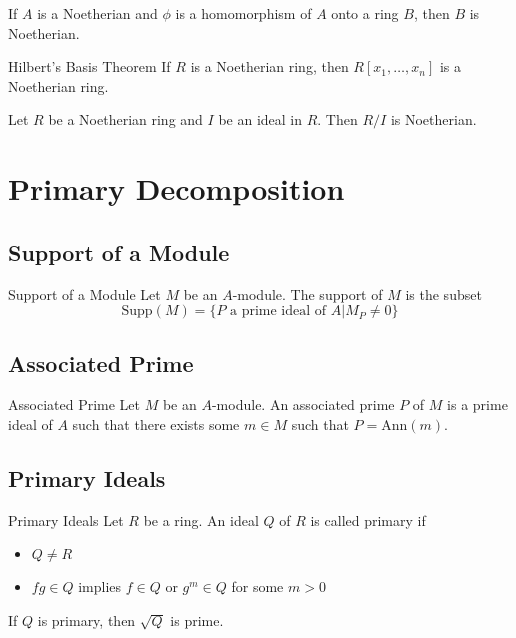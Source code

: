 \documentclass[a4paper]{article}
\begin{document}
\begin{prp}{}{} If $A$ is a Noetherian and $\phi$ is a homomorphism of $A$ onto a ring $B$, then $B$ is Noetherian. 
\end{prp}

\begin{thm}{Hilbert's Basis Theorem}{} If $R$ is a Noetherian ring, then $R[x_1,\dots,x_n]$ is a Noetherian ring. 
\end{thm}

\begin{prp}{}{} Let $R$ be a Noetherian ring and $I$ be an ideal in $R$. Then $R/I$ is Noetherian. 
\end{prp}

\pagebreak
\section{Primary Decomposition}
\subsection{Support of a Module}
\begin{defn}{Support of a Module}{} Let $M$ be an $A$-module. The support of $M$ is the subset $$\text{Supp}(M)=\{P\text{ a prime ideal of }A|M_P\neq 0\}$$
\end{defn}

\subsection{Associated Prime}
\begin{defn}{Associated Prime}{} Let $M$ be an $A$-module. An associated prime $P$ of $M$ is a prime ideal of $A$ such that there exists some $m\in M$ such that $P=\text{Ann}(m)$. 
\end{defn}

\subsection{Primary Ideals}
\begin{defn}{Primary Ideals}{} Let $R$ be a ring. An ideal $Q$ of $R$ is called primary if
\begin{itemize}
\item $Q\neq R$
\item $fg\in Q$ implies $f\in Q$ or $g^m\in Q$ for some $m>0$
\end{itemize}
\end{defn}

\begin{lmm}{}{} If $Q$ is primary, then $\sqrt{Q}$ is prime. 
\end{lmm}
\end{document}
